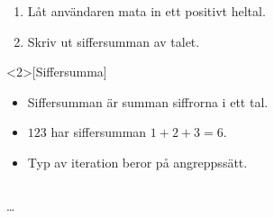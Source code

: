 \begin{frame}
  \begin{exercise}
    \begin{enumerate}
      \item Låt användaren mata in ett positivt heltal.
      \item Skriv ut siffersumman av talet.
    \end{enumerate}
  \end{exercise}

  \begin{definition}<2>[Siffersumma]
    \begin{itemize}
      \item Siffersumman är summan siffrorna i ett tal.
      \item \(123\) har siffersumman \(1 + 2 + 3 = 6\).
    \end{itemize}
  \end{definition}


  {\renewcommand\thefootnote{}
  }
\end{frame}

\begin{frame}[fragile]
  \begin{remark}
    \begin{itemize}
      \item Typ av iteration beror på angreppssätt.
    \end{itemize}
  \end{remark}
\end{frame}

\begin{frame}[fragile]
  \begin{solution}
    \inputminted[linenos,firstline=3,lastline=10]{python}{examples/siffersumma.py}
    \dots
    \inputminted[linenos,firstline=44]{python}{examples/siffersumma.py}
  \end{solution}
\end{frame}

\begin{frame}[fragile]
  \begin{solution}
    \inputminted[linenos,firstline=12,lastline=21]{python}{examples/siffersumma.py}
  \end{solution}
\end{frame}

